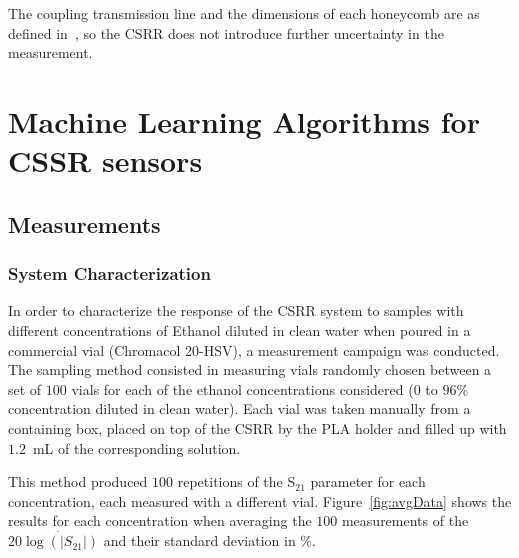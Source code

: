 \documentclass[journal,twoside,web]{ieeecolor}
\begin{document}
The coupling transmission line and the dimensions of each honeycomb are as defined in~\cite{Omer2020}, so the CSRR does not introduce further uncertainty in the measurement.

\section{Machine Learning Algorithms for CSSR sensors}
\label{sec:mlCSRRs}

\subsection{Measurements}
\label{ssec:mlMeasurement}
\subsubsection{System Characterization}
\label{sssec:sysCharac}
In order to characterize the response of the CSRR system to samples with different concentrations of Ethanol diluted in clean water when poured in a commercial vial (Chromacol 20-HSV), a measurement campaign was conducted. The sampling method consisted in measuring vials randomly chosen between a set of $100$ vials for each of the ethanol concentrations considered ($0$ to $96\%$ concentration diluted in clean water). Each vial was taken manually from a containing box, placed on top of the CSRR by the PLA holder and filled up with $1.2$~mL of the corresponding solution.  

This method produced $100$ repetitions of the S$_{21}$ parameter for each concentration, each measured with a different vial. Figure~\ref{fig:avgData} shows the results for each concentration when averaging the $100$ measurements of the $20\dot{\log\left(|S_{21}|\right)}$ and their standard deviation in $\%$.  
\end{document}
